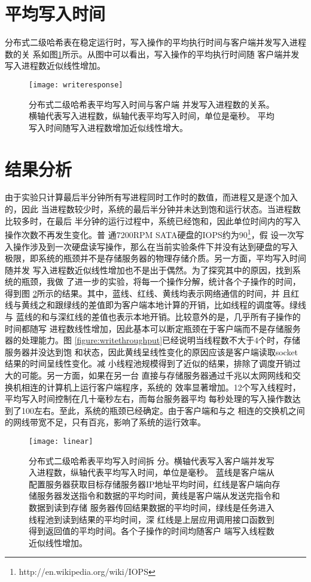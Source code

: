 \section{平均写入时间}
分布式二级哈希表在稳定运行时，写入操作的平均执行时间与客户端并发写入进程数的关
系如图\ref{figure:writeresponse}所示。从图中可以看出，写入操作的平均执行时间随
客户端并发写入进程数近似线性增加。
\begin{figure}[htb]
  \centering
  \texttt{[image: writeresponse]}
  \caption[分布式二级哈希表平均写入时间]{分布式二级哈希表平均写入时间与客户端
  并发写入进程数的关系。横轴代表写入进程数，纵轴代表平均写入时间，单位是毫秒。
  平均写入时间随写入进程数增加近似线性增大。}
  \label{figure:writeresponse}
\end{figure}

\section{结果分析}
由于实验只计算最后半分钟所有写进程同时工作时的数值，而进程又是逐个加入的，因此
当进程数较少时，系统的最后半分钟并未达到饱和运行状态。当进程数比较多时，在最后
半分钟的运行过程中，系统已经饱和，因此单位时间内的写入操作次数不再发生变化。普
通7200RPM SATA硬盘的IOPS约为90\footnote{http://en.wikipedia.org/wiki/IOPS}，假
设一次写入操作涉及到一次硬盘读写操作，那么在当前实验条件下并没有达到硬盘的写入
极限，即系统的瓶颈并不是存储服务器的物理存储介质。另一方面，平均写入时间随并发
写入进程数近似线性增加也不是出于偶然。为了探究其中的原因，找到系统的瓶颈，我做
了进一步的实验，将每一个操作分解，统计各个子操作的时间，得到图
\ref{figure:linear}所示的结果。其中，蓝线、红线、黄线均表示网络通信的时间，并
且红线与黄线之和跟绿线的差值即为客户端本地计算的开销，比如线程的调度等。绿线与
蓝线的和与深红线的差值也表示本地开销。比较意外的是，几乎所有子操作的时间都随写
进程数线性增加，因此基本可以断定瓶颈在于客户端而不是存储服务器的处理能力。图
\ref{figure:writethroughput}已经说明当线程数不大于4个时，存储服务器并没达到饱
和状态，因此黄线呈线性变化的原因应该是客户端读取socket结果的时间呈线性变化。减
小线程池规模得到了近似的结果，排除了调度开销过大的可能。另一方面，如果在另一台
直接与存储服务器通过千兆以太网网线和交换机相连的计算机上运行客户端程序，系统的
效率显著增加。12个写入线程时，平均写入时间控制在几十毫秒左右，而每台服务器平均
每秒处理的写入操作数达到了100左右。至此，系统的瓶颈已经确定。由于客户端和与之
相连的交换机之间的网线带宽不足，只有百兆，影响了系统的运行效率。
\begin{figure}[htb]
  \centering
  \texttt{[image: linear]}
  \caption[分布式二级哈希表平均写入时间拆分]{分布式二级哈希表平均写入时间拆
  分。横轴代表写入客户端并发写入进程数，纵轴代表平均写入时间，单位是毫秒。
  蓝线是客户端从配置服务器获取目标存储服务器IP地址平均时间，红线是客户端向存
  储服务器发送指令和数据的平均时间，黄线是客户端从发送完指令和数据到读到存储
  服务器传回结果数据的平均时间，绿线是任务进入线程池到读到结果的平均时间，深
  红线是上层应用调用接口函数到得到返回值的平均时间。各个子操作的时间均随客户
  端写入线程数近似线性增加。}
  \label{figure:linear}
\end{figure}
